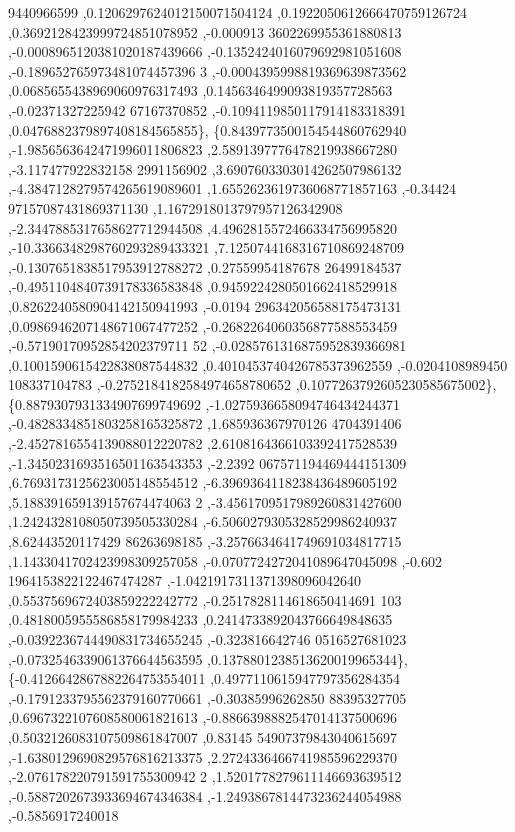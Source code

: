 \begin{DoxyCode}
      9440966599 ,0.1206297624012150071504124 ,0.1922050612666470759126724 ,0.3692128423999724851078952 ,-0.000913
      3602269955361880813 ,-0.0008965120381020187439666 ,-0.1352424016079692981051608 ,-0.189652765973481074457396
      3 ,-0.0004395998819369639873562 ,0.0685655438969060976317493 ,0.1456346499093819357728563 ,-0.02371327225942
      67167370852 ,-0.1094119850117914183318391 ,0.0476882379897408184565855\},
\{0.8439773500154544860762940 ,-1.9856563642471996011806823 ,2.5891397776478219938667280 ,-3.117477922832158
      2991156902 ,3.6907603303014262507986132 ,-4.3847128279574265619089601 ,1.6552623619736068771857163 ,-0.34424
      97157087431869371130 ,1.1672918013797957126342908 ,-2.3447885317658627712944508 ,4.4962815572466334756995820
       ,-10.3366348298760293289433321 ,7.1250744168316710869248709 ,-0.1307651838517953912788272 ,0.27559954187678
      26499184537 ,-0.4951104840739178336583848 ,0.9459224280501662418529918 ,0.8262240580904142150941993 ,-0.0194
      296342056588175473131 ,0.0986946207148671067477252 ,-0.2682264060356877588553459 ,-0.57190170952854202379711
      52 ,-0.0285761316875952839366981 ,0.1001590615422838087544832 ,0.4010453740426785373962559 ,-0.0204108989450
      108337104783 ,-0.2752184182584974658780652 ,0.1077263792605230585675002\},
\{0.8879307931334907699749692 ,-1.0275936658094746434244371 ,-0.4828334851803258165325872 ,1.685936367970126
      4704391406 ,-2.4527816554139088012220782 ,2.6108164366103392417528539 ,-1.3450231693516501163543353 ,-2.2392
      067571194469444151309 ,6.7693173125623005148554512 ,-6.3969364118238436489605192 ,5.188391659139157674474063
      2 ,-3.4561709517989260831427600 ,1.2424328108050739505330284 ,-6.5060279305328529986240937 ,8.62443520117429
      86263698185 ,-3.2576634641749691034817715 ,1.1433041702423998309257058 ,-0.0707724272041089647045098 ,-0.602
      1964153822122467474287 ,-1.0421917311371398096042640 ,0.5537569672403859222242772 ,-0.2517828114618650414691
      103 ,0.4818005955586858179984233 ,0.2414733892043766649848635 ,-0.0392236744490831734655245 ,-0.323816642746
      0516527681023 ,-0.0732546339061376644563595 ,0.1378801238513620019965344\},
\{-0.4126642867882264753554011 ,0.4977110615947797356284354 ,-0.1791233795562379160770661 ,-0.30385996262850
      88395327705 ,0.6967322107608580061821613 ,-0.8866398882547014137500696 ,0.5032126083107509861847007 ,0.83145
      54907379843040615697 ,-1.6380129690829576816213375 ,2.2724336466741985596229370 ,-2.076178220791591755300942
      2 ,1.5201778279611146693639512 ,-0.5887202673933694674346384 ,-1.2493867814473236244054988 ,-0.5856917240018

\end{DoxyCode}
